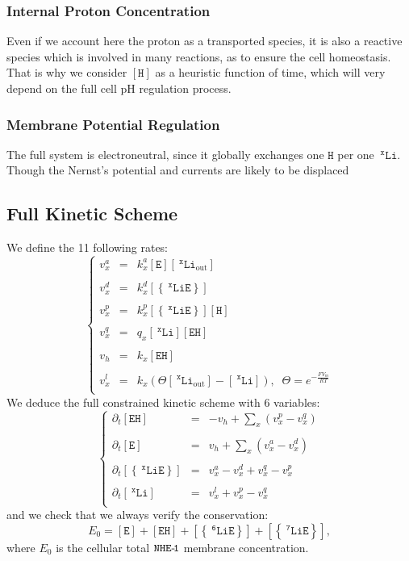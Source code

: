 \documentclass[aps,onecolumn,12pt]{revtex4}
\newcommand{\mychem}[1]{\mathtt{#1}}
\newcommand{\myconc}[1]{\left\lbrack{#1}\right\rbrack}
\newcommand{\spLi}[1]{{~^{\mychem{#1}}\mychem{Li}}}
\newcommand{\Li}[1]{\myconc{\spLi{#1}}}
\newcommand{\spEout}{\mychem{E}}
\newcommand{\Eout}{\myconc{\spEout}}
\newcommand{\spLiE}[1]{\left\lbrace\spLi{#1}\spEout\right\rbrace}
\newcommand{\LiE}[1]{\myconc{\spLiE{#1}}}
\newcommand{\spLiOut}[1]{{\spLi{#1}}_{\mathrm{out}}}
\newcommand{\LiOut}[1]{\myconc{\spLiOut{#1}}}
\newcommand{\spEHin}{\mychem{EH}}
\newcommand{\EHin}{\myconc{\spEHin}}
\newcommand{\spproton}{\mychem{H}}
\newcommand{\proton}{\myconc{\spproton}}
\newcommand{\NHE}[1]{\mychem{NHE}{\mychem{\hbox{-}\!#1}}}
\newcommand{\todo}[1]{\framebox{\textbf{\color{WildStrawberry}{#1}}}}
\begin{document}
\subsubsection{Internal Proton Concentration}
Even if we account here the proton as a transported species, it is also a reactive species which is involved in many reactions, as to ensure the cell homeostasis\todo{ref}. That is why we consider $\proton$ as a heuristic function of time, which will very depend on the full cell pH regulation process.

\subsubsection{Membrane Potential Regulation}
The full system is electroneutral, since it globally exchanges one $\spproton$ per one $\spLi{x}$. Though the Nernst's potential and currents are likely to be displaced \todo{more explanations?}

\subsection{Full Kinetic Scheme}
We define the 11 following rates:
\begin{equation}
	\label{eq:rates}
\left\lbrace
\begin{array}{rcl}
	v^a_x & = & k^a_x \Eout \LiOut{x} \\
	\\
	v^d_x & = & k^d_x \LiE{x} \\
	\\
	v^p_x & = & k^p_x \LiE{x} \proton\\
	\\
	v^q_x & = & q_x \Li{x} \EHin\\
	\\
	v_h   & = & k_x \EHin\\
	\\
	v^l_x & = & k_x\left(\Theta \LiOut{x} - \Li{x}\right),\;\;\Theta = e^{-\frac{FV_m}{RT}}\\
\end{array}
\right.
\end{equation}
We deduce the full constrained kinetic scheme with 6 variables:
\begin{equation}
	\label{eq:full}
\left\lbrace
\begin{array}{rcl}
\partial_t \EHin & = & -v_h + \sum_x\left(v^p_x - v^q_x\right)\\
\\
\partial_t \Eout & = & v_h + \sum_x(v^a_x -v^d_x)\\
\\
\partial_t \LiE{x} & = & v^a_x -v^d_x + v^q_x -v^p_x\\
\\
\partial_t \Li{x}  & = & v^l_x + v^p_x - v^q_x\\
\end{array}
\right.
\end{equation}
and we check that we always verify the conservation:
\begin{equation}
	E_0  =  \Eout + \EHin + \LiE{6} + \LiE{7},
\end{equation}
where $E_0$ is the cellular total $\NHE{1}$ membrane concentration.
\end{document}
